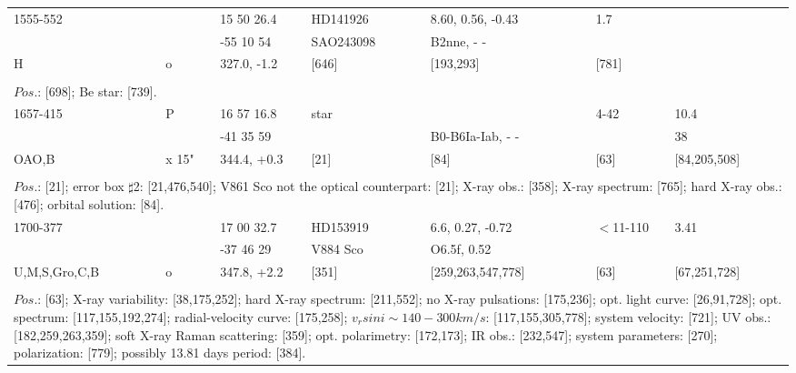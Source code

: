 \documentclass{aa}
\begin{document}
\begin{table*}[h]
\begin{tabular}{p{2.5cm}p{1cm}p{1.8cm}p{2.3cm}p{3.3cm}p{2.0cm}p{2.2cm}}
\noalign{\smallskip}
\hline
\noalign{\smallskip}
 1555-552     &           & 15 50 26.4      & HD141926         &  8.60, 0.56, -0.43     &     1.7            &          \\
                       &           & -55 10 54        &  SAO243098     &  B2nne, - -               &                       &          \\
     H               & o       & 327.0, -1.2       &     [646]             &   [193,293]               & [781]          &           \\
\\
\multicolumn{7}{p{17.5cm}}{
$Pos$.: [698]; Be star: [739].}\\

\noalign{\smallskip}
\hline
\noalign{\smallskip}
 1657-415      &   P      & 16 57 16.8     &  star             &                                   &  4-42             & 10.4           \\
                        &           & -41 35 59        &                       &  B0-B6Ia-Iab, - -    &                       & 38               \\
OAO,B          & x 15" & 344.4, +0.3     &     [21]           &     [84]                      &        [63]        & [84,205,508]   \\
\\
\multicolumn{7}{p{17.5cm}}{
$Pos$.: [21]; error box $\sharp $2: [21,476,540]; V861 Sco not the optical counterpart: [21]; X-ray obs.: [358]; 
X-ray spectrum: [765]; hard X-ray obs.: [476]; orbital solution: [84].} \\

\noalign{\smallskip}
\hline
\noalign{\smallskip}
 1700-377           &           & 17 00 32.7        & HD153919     & 6.6, 0.27, -0.72         & $<$11-110       &  3.41         \\
                             &           & -37 46 29          &  V884 Sco      & O6.5f, 0.52               &                           &                    \\
U,M,S,Gro,C,B &  o       & 347.8, +2.2       &     [351]           & [259,263,547,778]   &        [63]            &  [67,251,728]  \\
\\
\multicolumn{7}{p{17.5cm}}{
$Pos$.: [63]; X-ray variability: [38,175,252]; hard X-ray spectrum: [211,552]; no X-ray pulsations: [175,236]; opt. light 
curve: [26,91,728]; opt. spectrum: [117,155,192,274]; radial-velocity curve: [175,258]; $v_rsin i \sim 140-300 km/s$: 
[117,155,305,778]; system velocity: [721]; UV obs.: [182,259,263,359]; soft X-ray Raman scattering: [359]; opt. 
polarimetry: [172,173]; IR obs.: [232,547]; system parameters: [270]; polarization: [779]; possibly 13.81 days period: [384]. }\\


\end{tabular}
\end{table*}
\end{document}
